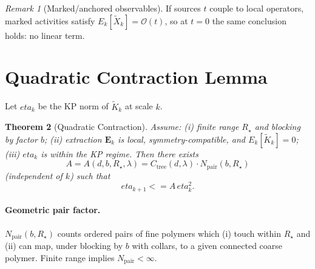 \documentclass[11pt]{article}
\def\;{ }%
\def\eta{eta}%
\def\E{E}%
\def\le{<=}%
\newtheorem{theorem}{Theorem}[section]
\theoremstyle{definition}
\theoremstyle{remark}
\newtheorem{remark}[theorem]{Remark}
\newcommand{\E}{\mathbb{E}}
\newcommand{\1}{\mathbbm{1}}
\newcommand{\pdfmath}[2]{\texorpdfstring{#1}{#2}}
\begin{document}
\begin{remark}[Marked/anchored observables]
If sources $t$ couple to local operators, marked activities satisfy $\E_k[\widetilde X_k]=\mathcal{O}(t)$, so at $t=0$ the same conclusion holds: no linear term.
\end{remark}

\section[\pdfmath{Quadratic contraction}{quadratic-contraction}]{Quadratic Contraction Lemma}
\label{sec:QCL}
Let $\eta_k$ be the KP norm of $\widetilde K_k$ at scale $k$.

\begin{theorem}[Quadratic Contraction]\label{thm:QCL}
Assume: (i) finite range $R_\star$ and blocking by factor $b$; (ii) extraction $\mathbf{E}_k$ is local, symmetry-compatible, and $\E_k[\widetilde K_k]=0$; (iii) $\eta_k$ is within the KP regime.
Then there exists
\[
A=A(d,b,R_\star,\lambda)=C_{\mathrm{tree}}(d,\lambda)\cdot N_{\mathrm{pair}}(b,R_\star)
\]
(independent of $k$) such that
\[
\boxed{\quad \eta_{k+1}\;\le\;A\,\eta_k^2. \quad}
\]
\end{theorem}

\paragraph{Geometric pair factor.}
$N_{\mathrm{pair}}(b,R_\star)$ counts ordered pairs of fine polymers which (i) touch within $R_\star$ and (ii) can map, under blocking by $b$ with collars, to a given connected coarse polymer. Finite range implies $N_{\mathrm{pair}}<\infty$.
\end{document}
